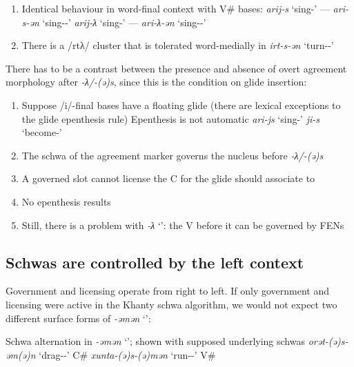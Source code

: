 \documentclass[a4paper, 12pt]{article}
\begin{document}
	\begin{enumerate}[$\gg$]
		\item Identical behaviour in word-final context with V\# bases:
			\pex
				\a \emph{arij-s} `sing-{\Pst}' --- \emph{ari-s-ən} `sing-{\Pst}-{\Ssg}'
				\a \emph{arij-λ} `sing-{\Npst}' --- \emph{ari-λ-ən} `sing-{\Npst}-{\Ssg}'
			\xe
		\item There is a /rtλ/ cluster that is tolerated word-medially in \emph{irt-s-ən} `turn-{\Pst}-{\Fdu}'
	\end{enumerate}
	There has to be a contrast between the presence and absence of overt agreement morphology after \emph{-λ/-(ə)s}, since this is the condition on glide insertion:

	
	\begin{enumerate}[$\gg$]
		\item Suppose /i/-final bases have a floating glide (there are lexical exceptions to the glide epenthesis rule)
			\pex Epenthesis is not automatic
				\a \emph{ari-js} \hfill `sing-{\Pst}'
				\a \emph{ji-s} \hfill `become-{\Pst}'
			\xe
		\item The schwa of the agreement marker governs the nucleus before \emph{-λ/-(ə)s}
		\item A governed slot cannot license the C for the glide should associate to
		\item No epenthesis results
		\item Still, there is a problem with \emph{-λ} `{\Npst}': the V before it can be governed by FENs
	\end{enumerate}
	
		\subsection{Schwas are controlled by the left context}
		
	Government and licensing operate from right to left. If only government and licensing were active in the Khanty schwa algorithm, we would not expect two different surface forms of \emph{-əmən} `{\Fdu}':

	\pex Schwa alternation in \emph{-əmən} `{\Fdu}'; shown with supposed underlying schwas 
		\a \emph{orət-(ə)s-əm(ə)n} `drag-{\Pst}-{\Fdu}' \hfill C\#
		\a \emph{xunta-(ə)s-(ə)mən} `run-{\Pst}-{\Fdu}' \hfill V\#
	\xe
	
\end{document}
